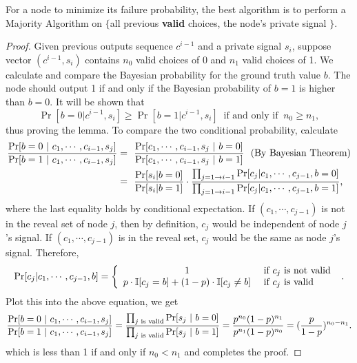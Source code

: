 \documentclass[a4paper,UKenglish]{lipics}
\theoremstyle{definition}
\newcommand\I{\mathbb{I}}
\begin{document}
For a node to minimize its failure probability, 
	the best algorithm is to perform a Majority Algorithm on 
	$\{$all previous \textbf{valid} choices, the node's private signal $\}$.

\begin{proof}
Given previous outputs sequence $c^{i-1}$ and a private signal $s_i$, 
	suppose vector $(c^{i-1}, s_i)$ contains $n_0$ valid choices of 0 and $n_1$ valid choices of 1. 
We calculate and compare the Bayesian probability for the ground truth value $b$.
The node should output 1 if and only if the Bayesian probability of $b=1$ is higher than $b=0$.
It will be shown that
\begin{equation*}
	\Pr[b = 0 | c^{i-1},s_i] \ge \Pr[b = 1|c^{i-1},s_i] 
	~\text{ if and only if }~ 
	n_0 \ge n_1,
\end{equation*}
thus proving the lemma. 
To compare the two conditional probability, calculate
\begin{align*}
	{\Pr[b = 0~|~c_1, \dotsb, c_{i - 1}, s_j ] 
	\over  
	\Pr[b = 1~|~c_1, \dotsb, c_{i - 1}, s_j ]} 
= & 
	~~{\Pr[c_1, \dotsb, c_{i - 1}, s_j ~|~ b = 0]
	\over
	\Pr[c_1, \dotsb, c_{i - 1}, s_j ~|~ b = 1]}
	~~
	(\text{By Bayesian Theorem})
\\
= &
	~~{\Pr[s_i|b = 0] \over  \Pr[s_i|b = 1]} 
	\cdot 
		{\prod_{j = 1 \to i-1} \Pr[c_j|c_1, \dotsb, c_{j - 1}, b = 0]
		\over
		\prod_{j = 1 \to i-1} \Pr[c_j|c_1, \dotsb, c_{j - 1}, b = 1]},
\end{align*}
where the last equality holds by conditional expectation. 
If $(c_1, \dotsb, c_{j - 1})$ is not in the reveal set of node $j$, 
	then by definition, $c_j$ would be independent of node $j$'s signal. 
If $(c_1, \dotsb, c_{j - 1})$ is in the reveal set, $c_j$ would be the same as node $j$'s signal. 
Therefore,
\begin{equation*}
	\Pr[c_j|c_1, \dotsb, c_{j - 1}, b] = 
	\left\{
	\begin{array} {c l}
	1 & \text{ if $c_j$ is not valid } \\
	p\cdot \I[c_j = b] + (1-p)\cdot \I[c_j\neq b] & \text{ if $c_j$ is valid } \\
	\end{array}
	\right..
\end{equation*}
Plot this into the above equation, we get	
\begin{align*}
	{\Pr[b = 0~|~c_1, \dotsb, c_{i - 1}, s_j ] 
	\over
	 \Pr[b = 1~|~c_1, \dotsb, c_{i - 1}, s_j ] }
= 
	{\prod_{j\text{ is valid}} \Pr[s_j~|~ b = 0]
	\over
	\prod_{j\text{ is valid}} \Pr[s_j~|~ b = 1]}
= 
	{ p^{n_0}(1-p)^{n_1} \over p^{n_1}(1-p)^{n_0} }
=
	({p \over  1 - p})^{n_0 - n_1}.
\end{align*}
which is less than 1 if and only if $n_0 < n_1$ and completes the proof.
\end{proof}
\end{document}
